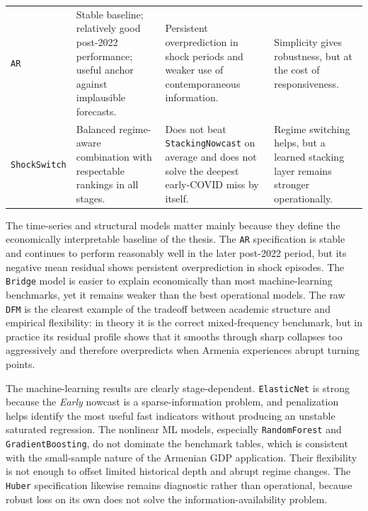 \documentclass[12pt,a4paper]{report}
\begin{document}
\begin{table}[H]
\begin{tabularx}{\textwidth}{>{\raggedright\arraybackslash}p{3.9cm}YYY}
        \texttt{AR} & Stable baseline; relatively good post-2022 performance; useful anchor against implausible forecasts. & Persistent overprediction in shock periods and weaker use of contemporaneous information. & Simplicity gives robustness, but at the cost of responsiveness. \\
        \texttt{ShockSwitch} & Balanced regime-aware combination with respectable rankings in all stages. & Does not beat \texttt{StackingNowcast} on average and does not solve the deepest early-COVID miss by itself. & Regime switching helps, but a learned stacking layer remains stronger operationally. \\
        \bottomrule
    \end{tabularx}
\end{table}

The time-series and structural models matter mainly because they define the economically interpretable baseline of the thesis. The \texttt{AR} specification is stable and continues to perform reasonably well in the later post-2022 period, but its negative mean residual shows persistent overprediction in shock episodes. The \texttt{Bridge} model is easier to explain economically than most machine-learning benchmarks, yet it remains weaker than the best operational models. The raw \texttt{DFM} is the clearest example of the tradeoff between academic structure and empirical flexibility: in theory it is the correct mixed-frequency benchmark, but in practice its residual profile shows that it smooths through sharp collapses too aggressively and therefore overpredicts when Armenia experiences abrupt turning points.

The machine-learning results are clearly stage-dependent. \texttt{ElasticNet} is strong because the \textit{Early} nowcast is a sparse-information problem, and penalization helps identify the most useful fast indicators without producing an unstable saturated regression. The nonlinear ML models, especially \texttt{RandomForest} and \texttt{GradientBoosting}, do not dominate the benchmark tables, which is consistent with the small-sample nature of the Armenian GDP application. Their flexibility is not enough to offset limited historical depth and abrupt regime changes. The \texttt{Huber} specification likewise remains diagnostic rather than operational, because robust loss on its own does not solve the information-availability problem.
\end{document}
